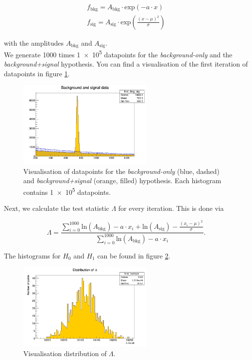 \documentclass[10pt]{article}
\newenvironment{myfont}{\fontfamily{put}\selectfont}{\par}
\begin{document}
\begin{myfont}
\begin{align}
f_{\textrm{bkg}} = A_{\textrm{bkg}} \cdot \textrm{exp}(- a \cdot x) \\
f_{\textrm{sig}} = A_{\textrm{sig}} \cdot \textrm{exp}\left(\frac{(x - \mu)^{2}}{\sigma}\right)
\end{align}

\noindent with the amplitudes $A_{\textrm{bkg}}$ and $A_{\textrm{sig}}$. \\
We generate \num{1000} times \num{1e5} datapoints for the \textit{background-only} and the \textit{background+signal} hypothesis.
You can find a visualisation of the first iteration of datapoints in figure \ref{fig:ex9_iter}.

\begin{figure}[H]
  \centering
  \includegraphics[width = 0.6\textwidth]{./exercise09_MCdata.png}
  \caption{Visualisation of datapoints for the \textit{background-only} (blue, dashed) and \textit{background+signal} (orange, filled) hypothesis.
  Each histogram contains \num{1e5} datapoints.}
  \label{fig:ex9_iter}
\end{figure}

\noindent Next, we calculate the test statistic $\Lambda$ for every iteration.
This is done via

\begin{equation}
\Lambda = \frac{\sum\limits_{i = 0}^{1000} \textrm{ln}\left(A_{\textrm{bkg}}\right) - a\cdot x_{i} + \textrm{ln}\left(A_{\textrm{sig}}\right) - \frac{(x_{i} - \mu)^{2}}{\sigma}}{\sum\limits_{i = 0}^{1000} \textrm{ln}\left(A_{\textrm{bkg}}\right) - a\cdot x_{i}}.
\end{equation}

\noindent The histograms for $H_{0}$ and $H_{1}$ can be found in figure \ref{fig:ex9_lambda}.

\begin{figure}[H]
  \centering
  \includegraphics[width = 0.6\textwidth]{./exercise09_Lambda.png}
  \caption{Visualisation distribution of $\Lambda$.}
  \label{fig:ex9_lambda}
\end{figure}

\end{myfont}
\end{document}
